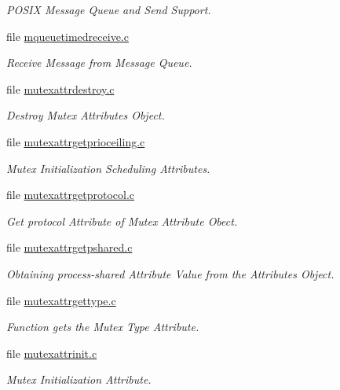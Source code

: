 \begin{DoxyCompactItemize}
\begin{DoxyCompactList}\small\item\em P\+O\+S\+IX Message Queue and Send Support. \end{DoxyCompactList}\item 
file \mbox{\hyperlink{mqueuetimedreceive_8c}{mqueuetimedreceive.\+c}}
\begin{DoxyCompactList}\small\item\em Receive Message from Message Queue. \end{DoxyCompactList}\item 
file \mbox{\hyperlink{mutexattrdestroy_8c}{mutexattrdestroy.\+c}}
\begin{DoxyCompactList}\small\item\em Destroy Mutex Attributes Object. \end{DoxyCompactList}\item 
file \mbox{\hyperlink{mutexattrgetprioceiling_8c}{mutexattrgetprioceiling.\+c}}
\begin{DoxyCompactList}\small\item\em Mutex Initialization Scheduling Attributes. \end{DoxyCompactList}\item 
file \mbox{\hyperlink{mutexattrgetprotocol_8c}{mutexattrgetprotocol.\+c}}
\begin{DoxyCompactList}\small\item\em Get protocol Attribute of Mutex Attribute Obect. \end{DoxyCompactList}\item 
file \mbox{\hyperlink{mutexattrgetpshared_8c}{mutexattrgetpshared.\+c}}
\begin{DoxyCompactList}\small\item\em Obtaining process-\/shared Attribute Value from the Attributes Object. \end{DoxyCompactList}\item 
file \mbox{\hyperlink{mutexattrgettype_8c}{mutexattrgettype.\+c}}
\begin{DoxyCompactList}\small\item\em Function gets the Mutex Type Attribute. \end{DoxyCompactList}\item 
file \mbox{\hyperlink{mutexattrinit_8c}{mutexattrinit.\+c}}
\begin{DoxyCompactList}\small\item\em Mutex Initialization Attribute. \end{DoxyCompactList}\item 

\end{DoxyCompactItemize}
